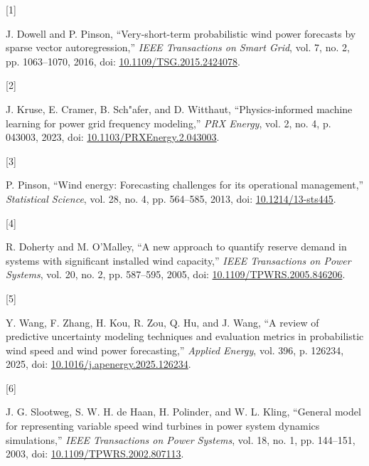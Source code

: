 \documentclass[
  journal]{IEEEtran}
\newlength{\cslhangindent}
\newlength{\csllabelwidth}
\newenvironment{CSLReferences}[2] %
 {\begin{list}{}{%
  \setlength{\itemindent}{0pt}
  \setlength{\leftmargin}{0pt}
  \setlength{\parsep}{0pt}
  \ifodd #1
   \setlength{\leftmargin}{\cslhangindent}
   \setlength{\itemindent}{-1\cslhangindent}
  \fi
  \setlength{\itemsep}{#2\baselineskip}}}
 {\end{list}}
\newcommand{\CSLLeftMargin}[1]{\parbox[t]{\csllabelwidth}{\strut#1\strut}}
\newcommand{\CSLRightInline}[1]{\parbox[t]{\linewidth - \csllabelwidth}{\strut#1\strut}}
\begin{document}
\protect{}\label{refs}
\begin{CSLReferences}{0}{0}
\CSLLeftMargin{{[}1{]} }%
\CSLRightInline{J. Dowell and P. Pinson, {``Very-short-term
probabilistic wind power forecasts by sparse vector autoregression,''}
\emph{IEEE Transactions on Smart Grid}, vol. 7, no. 2, pp. 1063--1070,
2016, doi:
\href{https://doi.org/10.1109/TSG.2015.2424078}{10.1109/TSG.2015.2424078}.}

\CSLLeftMargin{{[}2{]} }%
\CSLRightInline{J. Kruse, E. Cramer, B. Sch"afer, and D. Witthaut,
{``Physics-informed machine learning for power grid frequency
modeling,''} \emph{PRX Energy}, vol. 2, no. 4, p. 043003, 2023, doi:
\href{https://doi.org/10.1103/PRXEnergy.2.043003}{10.1103/PRXEnergy.2.043003}.}

\CSLLeftMargin{{[}3{]} }%
\CSLRightInline{P. Pinson, {``Wind energy: Forecasting challenges for
its operational management,''} \emph{Statistical Science}, vol. 28, no.
4, pp. 564--585, 2013, doi:
\href{https://doi.org/10.1214/13-sts445}{10.1214/13-sts445}.}

\CSLLeftMargin{{[}4{]} }%
\CSLRightInline{R. Doherty and M. O'Malley, {``A new approach to
quantify reserve demand in systems with significant installed wind
capacity,''} \emph{IEEE Transactions on Power Systems}, vol. 20, no. 2,
pp. 587--595, 2005, doi:
\href{https://doi.org/10.1109/TPWRS.2005.846206}{10.1109/TPWRS.2005.846206}.}

\CSLLeftMargin{{[}5{]} }%
\CSLRightInline{Y. Wang, F. Zhang, H. Kou, R. Zou, Q. Hu, and J. Wang,
{``A review of predictive uncertainty modeling techniques and evaluation
metrics in probabilistic wind speed and wind power forecasting,''}
\emph{Applied Energy}, vol. 396, p. 126234, 2025, doi:
\href{https://doi.org/10.1016/j.apenergy.2025.126234}{10.1016/j.apenergy.2025.126234}.}

\CSLLeftMargin{{[}6{]} }%
\CSLRightInline{J. G. Slootweg, S. W. H. de Haan, H. Polinder, and W. L.
Kling, {``General model for representing variable speed wind turbines in
power system dynamics simulations,''} \emph{IEEE Transactions on Power
Systems}, vol. 18, no. 1, pp. 144--151, 2003, doi:
\href{https://doi.org/10.1109/TPWRS.2002.807113}{10.1109/TPWRS.2002.807113}.}


\end{CSLReferences}
\end{document}
